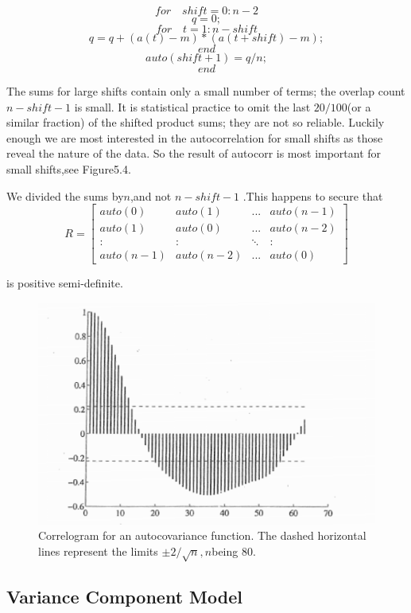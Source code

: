 
 \[ for \quad shift = 0:n-2 \]
 \[ q=0 ;\]
 \[ for\quad t=1:n-shift \]
 \[ q=q+(a(t)-m)*(a(t+shift)-m); \]
 \[ end \]
 \[ auto(shift+1)=q/n ;\]
 \[ end \]
 
 The sums for large shifts contain only a small number of terms; the overlap count $ n-shift-1 $  is small. It is statistical practice to omit the last  $20/100$(or a similar fraction) of the shifted product sums; they are not so reliable. Luckily enough we are most interested in the autocorrelation for small shifts as those reveal the nature of the data. So the result of autocorr is most important for small shifts,see Figure5.4. 
 
  We divided the sums by$  n $,and not $ n-shift-1 $ .This happens to secure that 
  \begin{equation}\label{5.34}
   R=\begin{bmatrix}
  auto(0)&auto(1)&...&auto(n-1)\\auto(1)&auto(0)&...&auto(n-2)\\ \colon&\colon&\ddots&\colon\\auto(n-1)&auto(n-2)&...&auto(0)
  \end{bmatrix}
  \end{equation}
  
 is positive semi-definite.
 
 
 
 \begin{figure}[h]
 	\centering
 	\includegraphics[width=0.7\linewidth]{TeX_files/Part02/chapter05/image/5}
 	\caption{Correlogram for an autocovariance function. The dashed horizontal lines represent the limits $ \pm2/\sqrt{n},n $being 80.}
 	\label{ }
 \end{figure}
  

\subsection{Variance Component Model}

